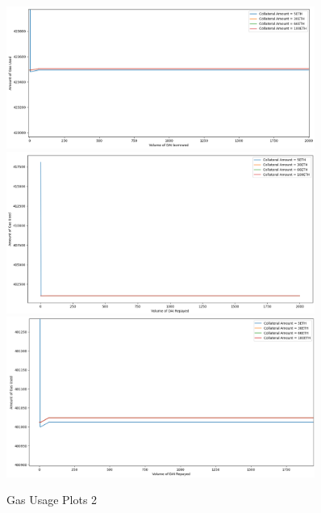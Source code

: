 \begin{figure}[!htb]
    \centering
    \includegraphics[width=0.9\textwidth]{project/Images/BorrowFees2.png}\\
    \includegraphics[width=0.9\textwidth]{project/Images/RepayFees1.png}\\
    \includegraphics[width=0.9\textwidth]{project/Images/RepayFees2.png}
    \caption{Gas Usage Plots 2 \label{fig:gasPlots2}}
\end{figure}

